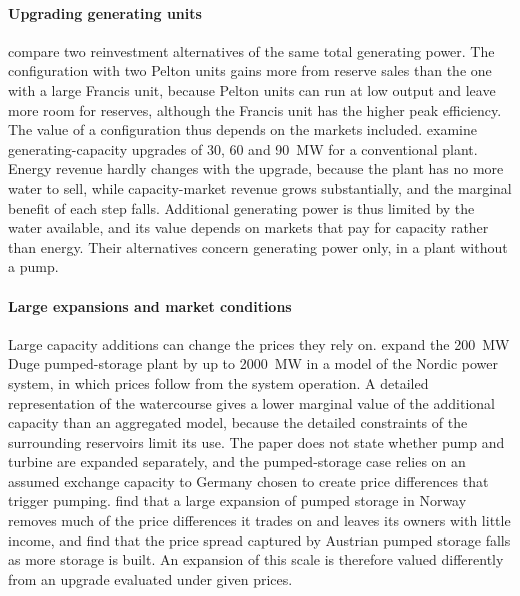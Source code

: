 \paragraph{Upgrading generating units}
\citet{helseth2017iet} compare two reinvestment alternatives of the same
total generating power. The configuration with two Pelton units gains
more from reserve sales than the one with a large Francis unit, because
Pelton units can run at low output and leave more room for reserves,
although the Francis unit has the higher peak efficiency. The value of a
configuration thus depends on the markets included.
\citet{bore2026assessing} examine generating-capacity upgrades of 30, 60
and \SI{90}{\mega\watt} for a conventional plant. Energy revenue hardly
changes with the upgrade, because the plant has no more water to sell,
while capacity-market revenue grows substantially, and the marginal
benefit of each step falls. Additional generating power is thus limited
by the water available, and its value depends on markets that pay for
capacity rather than energy. Their alternatives concern generating power
only, in a plant without a pump.

\paragraph{Large expansions and market conditions}
Large capacity additions can change the prices they rely on.
\citet{helseth2017} expand the \SI{200}{\mega\watt} Duge pumped-storage
plant by up to \SI{2000}{\mega\watt} in a model of the Nordic power
system, in which prices follow from the system operation. A detailed
representation of the watercourse gives a lower marginal value of the
additional capacity than an aggregated model, because the detailed
constraints of the surrounding reservoirs limit its use. The paper does
not state whether pump and turbine are expanded separately, and the
pumped-storage case relies on an assumed exchange capacity to Germany
chosen to create price differences that trigger pumping.
\citet{henden2016economic} find that a large expansion of pumped storage
in Norway removes much of the price differences it trades on and leaves
its owners with little income, and \citet{dallinger2019socioeconomic}
find that the price spread captured by Austrian pumped storage falls as
more storage is built. An expansion of this scale is therefore valued
differently from an upgrade evaluated under given prices.

